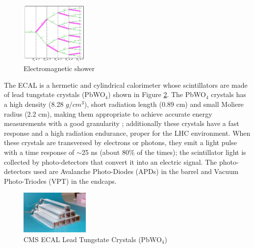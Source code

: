 \begin{figure}[ht]
    \begin{center}
      \includegraphics[width=0.3\textwidth]{figuras/Chapter2/EMshower}
      \caption{Electromagnetic shower
      } \label{figchp2:EMshower}
    \end{center}
 \end{figure}

The ECAL is a hermetic and cylindrical calorimeter whose scintillators are made of 
lead tungstate crystals (PbWO$_{4}$) shown in Figure \ref{figchp2:ECALcrytal}. The PbWO$_{4}$ crystals has a 
high density (8.28 $g/cm^{3}$), short radiation length (0.89 cm) and 
small Moliere radius (2.2 cm), making them appropriate to achieve 
accurate energy measurements with a good granularity \cite{chp2:CMS}; additionally 
these crystals have a fast response and a high radiation endurance, proper for the LHC environment. When 
these crystals are transversed by electrons or photons, they emit a light pulse 
with a time response of $\sim$25 ns (about 80$\%$ of the times); the scintillator
light is collected by photo-detectors that convert it into an electric signal. The 
photo-detectors used are Avalanche Photo-Diodes (APDs) in the barrel and Vacuum Photo-Triodes 
(VPT) in the endcaps. 

\begin{figure}[ht]
    \begin{center}
      \includegraphics[width=0.3\textwidth]{figuras/Chapter2/ECALcrytal.jpg}
      \caption{ CMS ECAL Lead Tungstate Crystals (PbWO$_{4}$)
      } \label{figchp2:ECALcrytal}
    \end{center}
 \end{figure}
 

